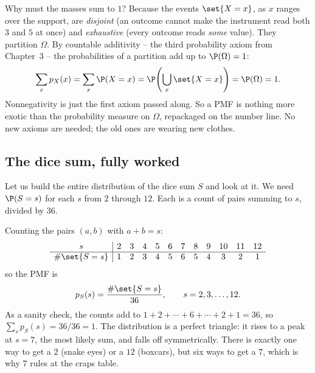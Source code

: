 \begin{whybox}
Why must the masses sum to $1$? Because the events $\set{X = x}$, as $x$ ranges over
the support, are \emph{disjoint} (an outcome cannot make the instrument read both $3$
and $5$ at once) and \emph{exhaustive} (every outcome reads \emph{some} value). They
partition $\Omega$. By countable additivity -- the third probability axiom from
Chapter~3 -- the probabilities of a partition add up to $\P(\Omega) = 1$:
\[
  \sum_x p_X(x) = \sum_x \P(X = x) = \P\!\left(\bigcup_x \set{X=x}\right) = \P(\Omega) = 1.
\]
Nonnegativity is just the first axiom passed along. So a PMF is nothing more
exotic than the probability measure on $\Omega$, repackaged on the number line. No new
axioms are needed; the old ones are wearing new clothes.
\end{whybox}

\subsection{The dice sum, fully worked}

Let us build the entire distribution of the dice sum $S$ and look at it. We need
$\P(S = s)$ for each $s$ from $2$ through $12$. Each is a count of pairs summing to $s$,
divided by $36$.

\begin{example}
\label{ch06:ex-dice-sum}
Counting the pairs $(a,b)$ with $a+b = s$:
\[
\begin{array}{c|ccccccccccc}
s & 2 & 3 & 4 & 5 & 6 & 7 & 8 & 9 & 10 & 11 & 12 \\ \hline
\#\set{S=s} & 1 & 2 & 3 & 4 & 5 & 6 & 5 & 4 & 3 & 2 & 1
\end{array}
\]
so the PMF is
\[
  p_S(s) = \frac{\#\set{S=s}}{36},
  \qquad s = 2,3,\dots,12.
\]
As a sanity check, the counts add to $1+2+\cdots+6+\cdots+2+1 = 36$, so
$\sum_s p_S(s) = 36/36 = 1$. The distribution is a perfect triangle: it rises to a
peak at $s = 7$, the most likely sum, and falls off symmetrically. There is exactly
one way to get a $2$ (snake eyes) or a $12$ (boxcars), but six ways to get a $7$,
which is why $7$ rules at the craps table.
\end{example}

